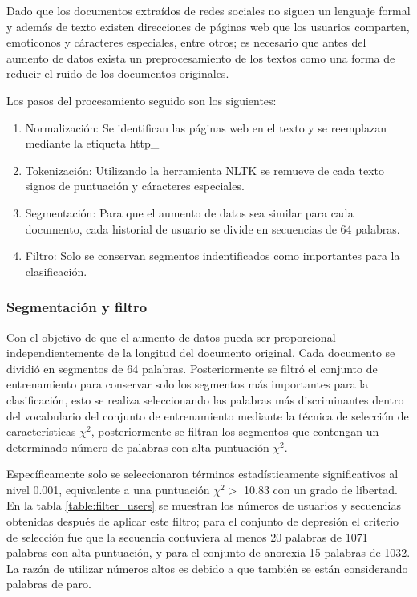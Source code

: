 Dado que los documentos extraídos de redes sociales no siguen un lenguaje formal y además de texto existen direcciones de páginas web que los usuarios comparten, emoticonos y cáracteres especiales, entre otros; es necesario que antes del aumento de datos exista un preprocesamiento de los textos como una forma de reducir el ruido de los documentos originales.

Los pasos del procesamiento seguido son los siguientes:

 \begin{enumerate}
     \item Normalización: Se identifican las páginas web en el texto y se reemplazan mediante la etiqueta http\_
     \item Tokenización: Utilizando la herramienta NLTK se remueve de cada texto signos de puntuación y cáracteres especiales.
     \item Segmentación: Para que el aumento de datos sea similar para cada documento, cada historial de usuario se divide en secuencias de 64 palabras. 
     \item Filtro: Solo se conservan segmentos indentificados como importantes para la clasificación.
 \end{enumerate}



\subsubsection{Segmentación y filtro}
Con el objetivo de que el aumento de datos pueda ser proporcional independientemente de la longitud del documento original. Cada documento se dividió en segmentos de 64 palabras. Posteriormente se filtró el conjunto de entrenamiento para conservar solo los segmentos más importantes para la clasificación, esto se realiza seleccionando las palabras más discriminantes dentro del vocabulario del conjunto de entrenamiento mediante la técnica de selección de características $\chi^2$, posteriormente se filtran los segmentos que contengan un determinado número de palabras con alta puntuación $\chi^2$. 

Específicamente solo se seleccionaron términos estadísticamente significativos al nivel 0.001, equivalente a una puntuación $\chi^2 > $ 10.83 con un grado de libertad. En la tabla \ref{table:filter_users} se muestran los números de usuarios y secuencias obtenidas después de aplicar este filtro; para el conjunto de depresión el criterio de selección fue que la secuencia contuviera al menos 20 palabras de 1071 palabras con alta puntuación, y para el conjunto de anorexia 15 palabras de 1032. La razón de utilizar números altos es debido a que también se están considerando palabras de paro.

